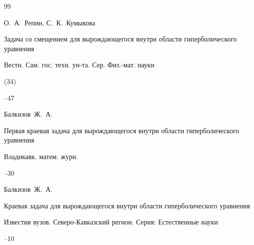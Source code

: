 \begin{thebibliography}{99}










\by О.~А.~Репин, С.~К.~Кумыкова

\paper Задача со смещением для вырождающегося внутри области гиперболического уравнения

\jour Вестн. Сам. гос. техн. ун-та. Сер. Физ.-мат. науки


(34)

--47







\by Балкизов~Ж.~А.

\paper Первая краевая задача для вырождающегося внутри области гиперболического уравнения

\jour Владикавк. матем. журн.




--30





\by Балкизов~Ж.~А.

\paper Краевая задача для вырождающегося внутри области гиперболического уравнения

\jour Известия вузов. Северо-Кавказский регион. Серия: Естественные науки



--10












\end{thebibliography}
